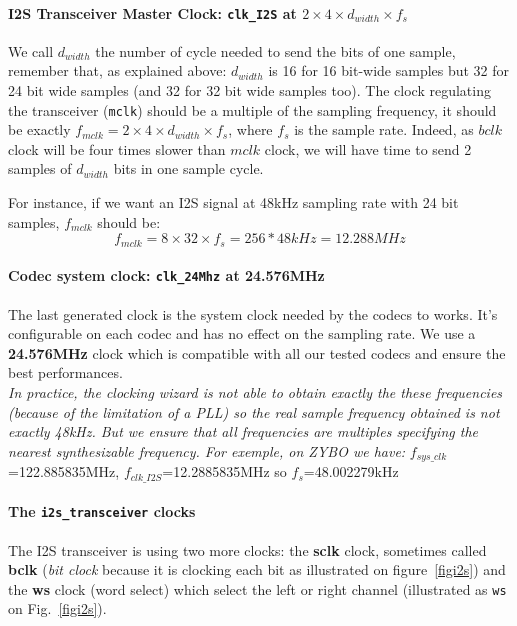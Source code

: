 \documentclass[11pt]{article}
\numberwithin{equation}{section}
\numberwithin{figure}{section}
\begin{document}
\paragraph{I2S Transceiver Master Clock: {\tt clk\_I2S} at $ 2\times 4 \times d_{width}\times f_s$}
We call $d_{width}$ the number of cycle needed to send the bits of one sample,  remember that, as explained above: $d_{width}$ is 16 for 16 bit-wide samples but 32 for 24 bit wide samples (and 32 for 32 bit wide samples too).   
The clock regulating the transceiver ({\tt mclk}) should be a multiple of the sampling frequency, it should be exactly $f_{mclk}=2\times 4\times d_{width}\times f_s$, where $f_s$ is the sample rate. Indeed, as $bclk$ clock will be four times  slower than $mclk$ clock, we will have time to send 2 samples of $d_{width}$ bits in one sample cycle. 

For instance, if we want an I2S signal at 48kHz sampling rate with 24 bit samples, $f_{mclk}$ should be: $$f_{mclk}=8 \times 32 \times f_s=256*48kHz =12.288MHz$$

\paragraph{Codec system clock: {\tt clk\_24Mhz} at 24.576MHz} The last generated clock is the system clock needed by the codecs to works. It's configurable on each codec and has no effect on the sampling rate. We use a {\bf 24.576MHz} clock which is compatible with all our tested codecs and ensure the best performances.\\

{\em In practice, the clocking wizard is not able to obtain exactly the these frequencies (because of the limitation of a PLL) so the real sample frequency obtained is not exactly 48kHz. But we ensure that all frequencies are multiples specifying the nearest synthesizable frequency. For exemple, on ZYBO we have:}
$f_{sys\_clk}$=122.885835MHz, $f_{clk\_I2S}$=12.2885835MHz so $f_{s}$=48.002279kHz

\paragraph{The {\tt i2s\_transceiver} clocks}
The I2S transceiver is using two more clocks: the {\bf sclk} clock, sometimes called  {\bf bclk} ({\em bit clock} because it is clocking each bit as illustrated on figure~\ref{figi2s}) and the {\bf ws} clock (word select) which select the left or right channel (illustrated as {\tt ws} on Fig.~\ref{figi2s}).
\end{document}
